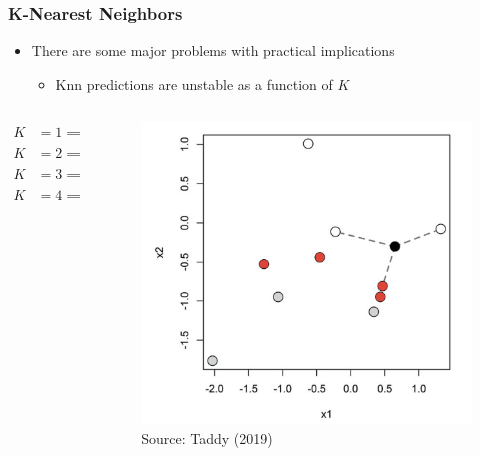 \documentclass[
  shownotes,
  xcolor={svgnames},
  hyperref={colorlinks,citecolor=DarkBlue,linkcolor=andesred,urlcolor=DarkBlue}
  , aspectratio=169]{beamer}
\begin{document}
\begin{frame}[fragile]
\frametitle{K-Nearest Neighbors}
\begin{itemize}
  \item There are some major problems with practical implications
  \medskip
  \begin{itemize}
  \item Knn predictions are unstable as a function of $K$
    \end{itemize}
\end{itemize}
  \begin{columns}[T] %
\begin{column}{.58\textwidth}
\begin{align}
  K&=1 \implies \hat{p}(white)=0 \nonumber \\
  K&=2 \implies \hat{p}(white)=1/2 \nonumber \\
  K&=3 \implies \hat{p}(white)=2/3 \nonumber \\
  K&=4 \implies \hat{p}(white)=1/2 \nonumber 
  \end{align}


\end{column}
\hfill
\begin{column}{.4\textwidth}
\begin{figure}[H] \centering
            \captionsetup{justification=centering}
              \includegraphics[scale=0.1]{figures/knn}
              \\
              \tiny
              Source: Taddy (2019)
 \end{figure}
\end{column}
\end{columns}
  
\end{frame}
\end{document}
